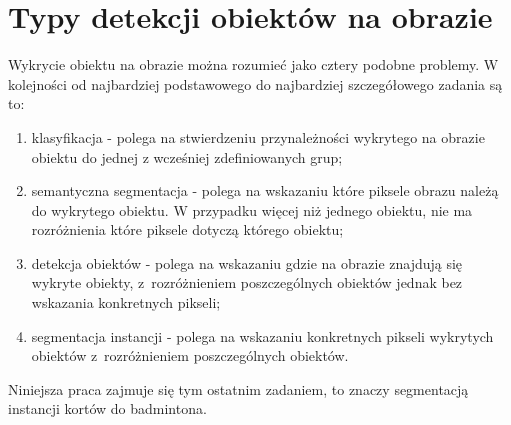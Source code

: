 \section{Typy detekcji obiektów na obrazie}
\label{sec:typy_detekcji}

Wykrycie obiektu na obrazie można rozumieć jako cztery podobne problemy.
W kolejności od najbardziej podstawowego do najbardziej szczegółowego zadania są to:

\begin{enumerate}
	\item klasyfikacja - polega na stwierdzeniu przynależności wykrytego na obrazie obiektu do jednej z wcześniej zdefiniowanych grup;
  \item semantyczna segmentacja - polega na wskazaniu które piksele obrazu należą do wykrytego obiektu.
        W przypadku więcej niż jednego obiektu, nie ma rozróżnienia które piksele dotyczą którego obiektu;
	\item detekcja obiektów - polega na wskazaniu gdzie na obrazie znajdują się wykryte obiekty, z~rozróżnieniem poszczególnych obiektów jednak bez wskazania konkretnych pikseli;
	\item segmentacja instancji - polega na wskazaniu konkretnych pikseli wykrytych obiektów z~rozróżnieniem poszczególnych obiektów.
\end{enumerate}

Niniejsza praca zajmuje się tym ostatnim zadaniem, to znaczy segmentacją instancji kortów do badmintona.
